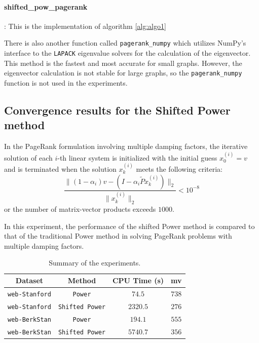 \paragraph{shifted\_pow\_pagerank}: This is the implementation of algorithm \ref{alg:algo1} \vspace{0.5cm}

\noindent There is also another function called \texttt{pagerank\_numpy} which utilizes NumPy's interface to the \texttt{LAPACK} eigenvalue solvers for the calculation of the eigenvector. This method is the fastest and most accurate for small graphs. However, the eigenvector calculation is not stable for large graphs, so the \texttt{pagerank\_numpy} function is not used in the experiments.

\subsection{Convergence results for the Shifted Power method}

In the PageRank formulation involving multiple damping factors, the iterative solution of each $i$-th linear system is initialized with the initial guess $x_0^{(i)} = v$ and is terminated when the solution $x_k^{(i)}$ meets the following criteria:
\begin{equation*}
    \frac{\lVert (1 - \alpha_i)v - (I - \alpha_i \tilde P x_k^{(i)}) \rVert_2}{\lVert x_k^{(i)} \rVert_2} < 10^{-8}
\end{equation*}
or the number of matrix-vector products exceeds $1000$. \vspace*{0.5cm}

\noindent In this experiment, the performance of the shifted Power method is compared to that of the traditional Power method in solving PageRank problems with multiple damping factors.

\begin{table}[h]
\centering
\begin{tabular}{|c|c|c|c|}
\hline
\textbf{Dataset} & \textbf{Method} & \textbf{CPU Time (s)} & \textbf{mv} \\ \hline
\texttt{web-Stanford} & \texttt{Power} & $74.5$ & $738$  \\ \hline
\texttt{web-Stanford} & \texttt{Shifted Power} & $2320.5$ & $276$ \\ \hline

\hline

\texttt{web-BerkStan} & \texttt{Power} & $194.1$ & $555$  \\ \hline
\texttt{web-BerkStan} & \texttt{Shifted Power} & $5740.7$ & $356$ \\ \hline
\end{tabular}
\caption{Summary of the experiments.}
\label{tab:results}
\end{table}

